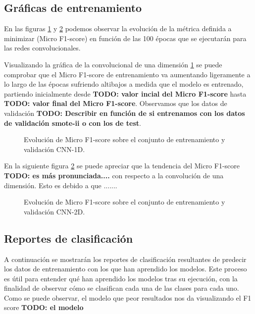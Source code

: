   
  \subsection{Gráficas de entrenamiento}


    En las figuras \ref{F1Score1DImage} y \ref{F1Score2DImage} podemos observar la evolución de la métrica definida a minimizar (Micro F1-score) en función de las 100 épocas que se ejecutarán para las redes convolucionales.


    Visualizando la gráfica de la convolucional de una dimensión \ref{F1Score1DImage} se puede comprobar que el Micro F1-score de entrenamiento va aumentando ligeramente a lo largo de las épocas sufriendo altibajos a medida que el modelo es entrenado, partiendo inicialmente desde \textbf{TODO: valor incial del Micro F1-score} hasta \textbf{TODO: valor final del Micro F1-score}. Observamos que los datos de validación \textbf{TODO: Describir en función de si entrenamos con los datos de validación smote-ii o con los de test}.

    \begin{figure}[h]
        \centering
        
        \caption{Evolución de Micro F1-score sobre el conjunto de entrenamiento y validación CNN-1D.}
        \label{F1Score1DImage}
     \end{figure}

    En la siguiente figura \ref{F1Score2DImage} se puede apreciar que la tendencia del Micro F1-score \textbf{TODO: es más pronunciada....} con respecto a la convolución de una dimensión. Esto es debido a que ....... 

    \begin{figure}[h]
        \centering
        
        \caption{Evolución de Micro F1-score sobre el conjunto de entrenamiento y validación CNN-2D.}
        \label{F1Score2DImage}
     \end{figure}


  \subsection{Reportes de clasificación}
       
    A continuación se mostrarán los reportes de clasificación resultantes de predecir los datos de entrenamiento con los que han aprendido los modelos. Este proceso es útil para entender qué han aprendido los modelos tras su ejecución, con la finalidad de observar cómo se clasifican cada una de las clases para cada uno. Como se puede observar, el modelo que peor resultados nos da visualizando el F1 score \textbf{TODO: el modelo}

